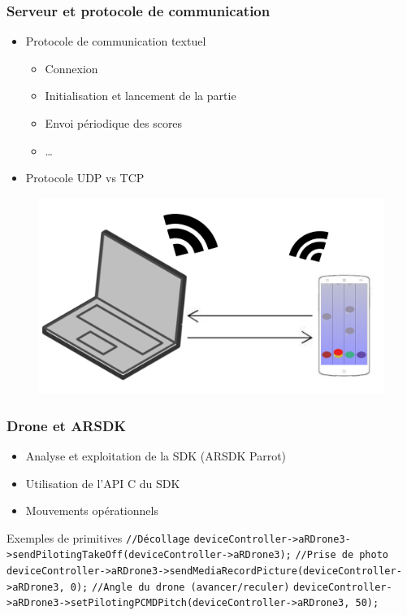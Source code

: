 \begin{frame}
\frametitle{Serveur et protocole de communication}
\begin{center}
\begin{itemize}
\item Protocole de communication textuel
\begin{itemize}
\item Connexion 
\item Initialisation et lancement de la partie
\item Envoi périodique des scores
\item \dots
\end{itemize}
\item Protocole UDP vs TCP
\end{itemize}
\begin{figure}
\includegraphics[scale=0.05]{images/client_serveur.jpg}
\end{figure}
\end{center}
\end{frame}

\begin{frame}
\frametitle{Drone et ARSDK}
\begin{center}
\begin{itemize}
\item Analyse et exploitation de la SDK (ARSDK Parrot)
\item Utilisation de l'API C du SDK
\item Mouvements opérationnels
\end{itemize}
\begin{exampleblock}{Exemples de primitives}
{\tiny
\verb!//Décollage! \newline
\verb!deviceController->aRDrone3->sendPilotingTakeOff(deviceController->aRDrone3);! \newline
\verb!//Prise de photo! \newline
\verb!deviceController->aRDrone3->sendMediaRecordPicture(deviceController->aRDrone3, 0);! \newline
\verb!//Angle du drone (avancer/reculer)! \newline
\verb!deviceController->aRDrone3->setPilotingPCMDPitch(deviceController->aRDrone3, 50);!}
\end{exampleblock}
\end{center}
\end{frame}

